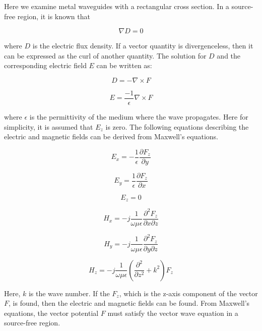 \documentclass[a4paper,12pt]{report}
\begin{document}
Here we examine metal waveguides with a rectangular cross section.
In a source-free region, it is known that

\begin{equation}
  \nabla D = 0
\end{equation}

where $D$ is the electric flux density.
If a vector quantity is divergenceless,
then it can be expressed as the curl of another quantity.
The solution for $D$ and the corresponding electric field $E$
can be written as:

\begin{equation}
  D = -\nabla \times F
\end{equation}

\begin{equation}
  E = \frac{-1}{\epsilon}\nabla \times F
\end{equation}

where $\epsilon$ is the permittivity of the medium where the wave propagates.
Here for simplicity, it is assumed that $E_z$ is zero.
The following equations describing the electric and magnetic fields can be derived from Maxwell's equations.

\begin{equation}
  E_x = -\frac{1}{\epsilon}\frac{\partial F_z}{\partial y}
\end{equation}

\begin{equation}
  E_y = \frac{1}{\epsilon}\frac{\partial F_z}{\partial x}
\end{equation}

\begin{equation}
  E_z = 0
\end{equation}

\begin{equation}
  H_x = -j\frac{1}{\omega\mu\epsilon}\frac{\partial^2F_z}{\partial x \partial z}
\end{equation}

\begin{equation}
  H_y = -j\frac{1}{\omega\mu\epsilon}\frac{\partial^2F_z}{\partial y \partial z}
\end{equation}

\begin{equation}
  H_z = -j\frac{1}{\omega\mu\epsilon}(\frac{\partial^2}{\partial z^2} + k^2)F_z
\end{equation}

Here, $k$ is the wave number.
If the $F_z$, which is the z-axis component of the vector $F$, is found,
then the electric and magnetic fields can be found.
From Maxwell's equations, the vector potential $F$ must satisfy the vector wave equation
in a source-free region.
\end{document}

